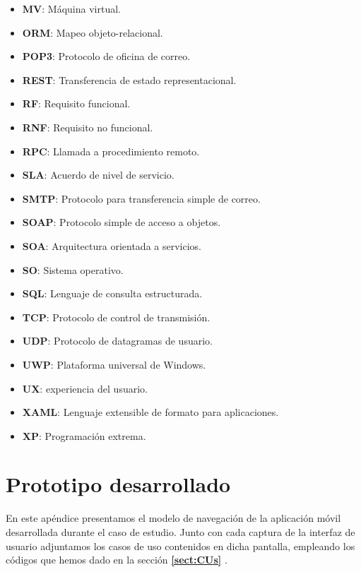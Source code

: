 \documentclass[11pt,spanish,listoffigures]{tfgetsinf}
\begin{document}
\begin{itemize}
\item \textbf{MV}: Máquina virtual.
\item \textbf{ORM}: Mapeo objeto-relacional.
\item \textbf{POP3}: Protocolo de oficina de correo.
\item \textbf{REST}: Transferencia de estado representacional.
\item \textbf{RF}: Requisito funcional.
\item \textbf{RNF}: Requisito no funcional.
\item \textbf{RPC}: Llamada a procedimiento remoto.
\item \textbf{SLA}: Acuerdo de nivel de servicio.
\item \textbf{SMTP}: Protocolo para transferencia simple de correo.
\item \textbf{SOAP}: Protocolo simple de acceso a objetos.
\item \textbf{SOA}: Arquitectura orientada a servicios.
\item \textbf{SO}: Sistema operativo.
\item \textbf{SQL}: Lenguaje de consulta estructurada.
\item \textbf{TCP}: Protocolo de control de transmisión.
\item \textbf{UDP}: Protocolo de datagramas de usuario.
\item \textbf{UWP}: Plataforma universal de Windows.
\item \textbf{UX}: experiencia del usuario.
\item \textbf{XAML}: Lenguaje extensible de formato para aplicaciones.
\item \textbf{XP}: Programación extrema.

\end{itemize}

%

\chapter{Prototipo desarrollado} \label{ch:ModeloNavegacion}

En este apéndice presentamos el modelo de navegación de la aplicación móvil desarrollada durante el caso de estudio. Junto con cada captura de la interfaz de usuario adjuntamos los casos de uso contenidos en dicha pantalla, empleando los códigos que hemos dado en la sección \textbf{\ref{sect:CUs} }.
\end{document}
